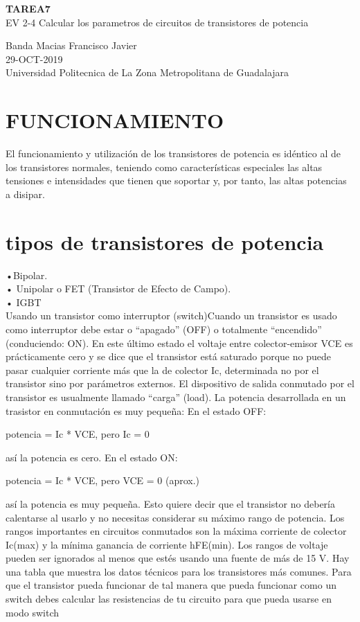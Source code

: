 \documentclass[11pt,a4paper]{article}
\begin{document}
\begin{center}
\textbf{TAREA7}\\ 
EV 2-4 Calcular los parametros de circuitos de transistores de potencia
\end{center}

\begin{center}
Banda Macias Francisco Javier\\
29-OCT-2019\\
Universidad Politecnica de La Zona Metropolitana de Guadalajara
\end{center}


\section{FUNCIONAMIENTO}
El funcionamiento y utilización de los transistores de potencia es idéntico al de los transistores normales, teniendo como características especiales las altas tensiones e intensidades que tienen que soportar y, por tanto, las altas potencias a disipar.
\section{ tipos de transistores de potencia}
       •Bipolar.\\
•	Unipolar o FET (Transistor de Efecto de Campo).\\
•	IGBT\\
Usando un transistor como interruptor (switch)Cuando un transistor es usado como interruptor debe estar o “apagado” (OFF) o totalmente “encendido” (conduciendo: ON).
En este último estado el voltaje entre colector-emisor VCE es prácticamente cero y se dice que el transistor está saturado porque no puede pasar cualquier corriente más que la de colector Ic, determinada no por el transistor sino por parámetros externos. El dispositivo de salida conmutado por el transistor es usualmente llamado “carga” (load). La potencia desarrollada en un trasistor en conmutación es muy pequeña: 
En el estado OFF:
\begin{center}
potencia = Ic * VCE,
pero Ic = 0
\end{center}
 así la potencia es cero.
En el estado ON: 
\begin{center}
potencia = Ic * VCE, pero VCE = 0 (aprox.)
\end{center}
 así la potencia es muy pequeña. 
Esto quiere decir que el transistor no debería calentarse al usarlo y no necesitas considerar su máximo rango de potencia. Los rangos importantes en circuitos conmutados son la máxima corriente de colector Ic(max) y la mínima ganancia de corriente hFE(min). Los rangos de voltaje pueden ser ignorados al menos que estés usando una fuente de más de 15 V. Hay una tabla que muestra los datos técnicos para los transistores más comunes.
Para que el transistor pueda funcionar  de tal manera que  pueda funcionar como un switch   debes calcular las resistencias de tu circuito para que pueda  usarse en modo switch
\end{document}
